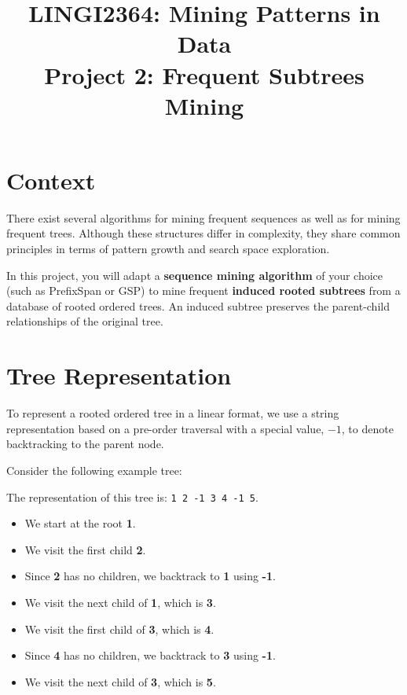 \documentclass[]{article}
\title{LINGI2364: Mining Patterns in Data \\ \bf Project 2: Frequent Subtrees Mining}
\date{}
\begin{document}
	\maketitle
	
	\section{Context}
There exist several algorithms for mining frequent sequences as well as for mining frequent trees. Although these structures differ in complexity, they share common principles in terms of pattern growth and search space exploration.

In this project, you will adapt a \textbf{sequence mining algorithm} of your choice (such as PrefixSpan or GSP) to mine frequent \textbf{induced rooted subtrees} from a database of rooted ordered trees. An induced subtree preserves the parent-child relationships of the original tree.

\section{Tree Representation}

To represent a rooted ordered tree in a linear format, we use a string representation based on a pre-order traversal with a special value, $-1$, to denote backtracking to the parent node.

Consider the following example tree:

\begin{center}
\end{center}

The representation of this tree is: \texttt{1 2 -1 3 4 -1 5}. 

\begin{itemize}
    \item We start at the root \textbf{1}.
    \item We visit the first child \textbf{2}.
    \item Since \textbf{2} has no children, we backtrack to \textbf{1} using \textbf{-1}.
    \item We visit the next child of \textbf{1}, which is \textbf{3}.
    \item We visit the first child of \textbf{3}, which is \textbf{4}.
    \item Since \textbf{4} has no children, we backtrack to \textbf{3} using \textbf{-1}.
    \item We visit the next child of \textbf{3}, which is \textbf{5}.
\end{itemize}
\end{document}
